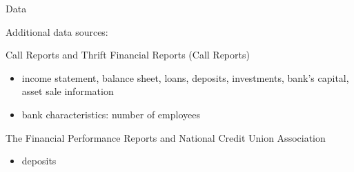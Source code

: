 \documentclass[notes,11pt, aspectratio=169]{beamer}
\newenvironment{wideitemize}{\itemize\addtolength{\itemsep}{10pt}}{\enditemize}
\begin{document}
    \begin{frame}{Data}

    Additional data sources:
    \vspace{0.3cm}
    \begin{wideitemize}
      \item Call Reports and Thrift Financial Reports (Call Reports)
        
      \begin{itemize}
          \item income statement, balance sheet, loans, deposits, investments,  bank's capital, asset sale information
          \item bank characteristics: number of employees
        
          
      \end{itemize}

      \item The Financial Performance Reports and National Credit Union Association
        \begin{itemize}
          \item deposits 
      \end{itemize}
    \end{wideitemize}

  \end{frame}









\end{document}
